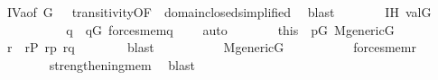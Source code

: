 \begin{isabellebody}
\ IV{}{}{}a{\isacharbrackleft}{\kern0pt}of\ G\ {\isasymsigma}\ {\isasymtheta}{\isacharbrackright}{\kern0pt}\ transitivity{\isacharbrackleft}{\kern0pt}OF\ {\isacharunderscore}{\kern0pt}\ domain{\isacharunderscore}{\kern0pt}closed{\isacharbrackleft}{\kern0pt}simplified{\isacharbrackright}{\kern0pt}{\isacharbrackright}{\kern0pt}\ \isamarkupfalse%
\ blast\isanewline
\ \ \ \ \isamarkupfalse%
\ \isamarkupfalse%
\ IH\ {\isacartoucheopen}val{\isacharparenleft}{\kern0pt}G{\isacharcomma}{\kern0pt}{\isasymtau}{\isacharparenright}{\kern0pt}\ {\isacharequal}{\kern0pt}\ {\isacharunderscore}{\kern0pt}{\isacartoucheclose}\isanewline
\ \ \ \ \isamarkupfalse%
\isanewline
\ \ \ \ \isamarkupfalse%
\ q\ \ {\isachardoublequoteopen}q{\isasymin}G{\isachardoublequoteclose}\ {\isachardoublequoteopen}forces{\isacharunderscore}{\kern0pt}mem{\isacharparenleft}{\kern0pt}q{\isacharcomma}{\kern0pt}\ {\isasymsigma}{\isacharcomma}{\kern0pt}\ {\isasymtau}{\isacharparenright}{\kern0pt}{\isachardoublequoteclose}\ \isamarkupfalse%
\ auto\isanewline
\ \ \ \ \isamarkupfalse%
\ \isamarkupfalse%
\ this\ \ {\isacartoucheopen}p{\isasymin}G{\isacartoucheclose}\ {\isacartoucheopen}M{\isacharunderscore}{\kern0pt}generic{\isacharparenleft}{\kern0pt}G{\isacharparenright}{\kern0pt}{\isacartoucheclose}\isanewline
\ \ \ \ \isamarkupfalse%
\ r\ \ {\isachardoublequoteopen}r{\isasymin}P{\isachardoublequoteclose}\ {\isachardoublequoteopen}r{\isasympreceq}p{\isachardoublequoteclose}\ {\isachardoublequoteopen}r{\isasympreceq}q{\isachardoublequoteclose}\isanewline
\ \ \ \ \ \ \isamarkupfalse%
\ blast\isanewline
\ \ \ \ \isamarkupfalse%
\isanewline
\ \ \ \ \isamarkupfalse%
\ {\isacartoucheopen}M{\isacharunderscore}{\kern0pt}generic{\isacharparenleft}{\kern0pt}G{\isacharparenright}{\kern0pt}{\isacartoucheclose}\isanewline
\ \ \ \ \isamarkupfalse%
\isanewline
\ \ \ \ \isamarkupfalse%
\ {\isachardoublequoteopen}forces{\isacharunderscore}{\kern0pt}mem{\isacharparenleft}{\kern0pt}r{\isacharcomma}{\kern0pt}\ {\isasymsigma}{\isacharcomma}{\kern0pt}\ {\isasymtau}{\isacharparenright}{\kern0pt}{\isachardoublequoteclose}\isanewline
\ \ \ \ \ \ \isamarkupfalse%
\ strengthening{\isacharunderscore}{\kern0pt}mem\ \isamarkupfalse%
\ blast\isanewline
\ \ \ \ \isamarkupfalse%

\end{isabellebody}
